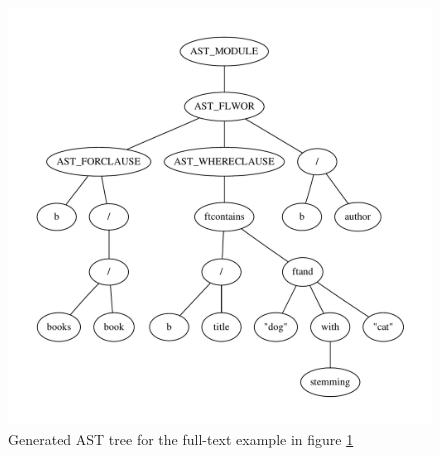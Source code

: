 \begin{figure}[h]
\centering
 \includegraphics[width=1\textwidth]{img/graphs/ftq1}
\caption{Generated AST tree for the full-text example in figure \ref{tree:ast:ftq1}}
\label{tree:ast:ftq1}
\end{figure}
